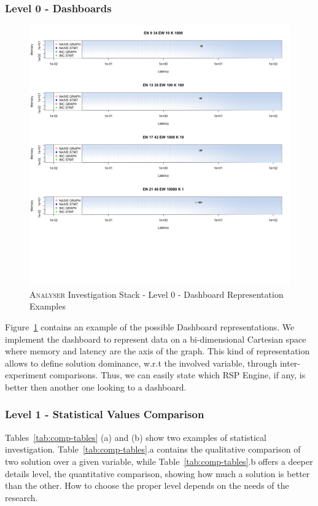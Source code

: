 \subsubsection{Level 0 - Dashboards}\label{sec:impl-level0}

\begin{figure}[h!tbp]
  \centering
	\includegraphics[width=0.6\linewidth]{images/dashboard-example}
	\caption[\textsc{Analyser} Investigation Stack - Level 0 -  Dashboard Representation Examples]{\textsc{Analyser} Investigation Stack - Level 0 -  Dashboard Representation Examples}
  	\label{fig:dashboard-example}
\end{figure}

\noindent Figure~\ref{fig:dashboard-example} contains an example of the possible Dashboard representations. We implement the dashboard to represent data on a bi-dimensional Cartesian space where memory and latency are the axis of the graph. This kind of representation allows to define solution dominance, w.r.t the involved variable, through inter-experiment comparisons. Thus, we can easily state which RSP Engine, if any, is better then another one looking to a dashboard.

\subsubsection{Level 1 - Statistical Values Comparison}\label{sec:impl-level1}

Tables~\ref{tab:comp-tables} (a) and (b) show two examples of statistical investigation. Table~\ref{tab:comp-tables}.a contains the qualitative comparison of two solution over a given variable, while Table~\ref{tab:comp-tables}.b offers a deeper details level, the quantitative comparison, showing how much a solution is better than the other. How to choose the proper level depends on the needs of the research.

